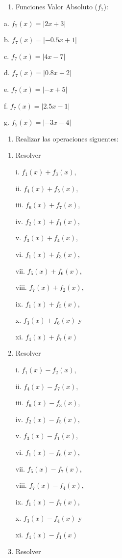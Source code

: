 \documentclass[]{book}
\providecommand{\tightlist}{%
  \setlength{\itemsep}{0pt}\setlength{\parskip}{0pt}}
\begin{document}
\begin{enumerate}
\def\labelenumi{\arabic{enumi}.}
\setcounter{enumi}{6}
\tightlist
\item
  Funciones Valor Absoluto (\(f_7\)):
\end{enumerate}

\begin{multicols}{2}
    a. $f_7(x) = |2x + 3|$
    
    b. $f_7(x) = |-0.5x + 1|$
    
    c. $f_7(x) = |4x - 7|$
    
    d. $f_7(x) = |0.8x + 2|$
    
    e. $f_7(x) = |-x + 5|$
    
    f. $f_7(x) = |2.5x - 1|$
    
    g. $f_7(x) = |-3x - 4|$
\end{multicols}

\begin{enumerate}
\def\labelenumi{\arabic{enumi}.}
\setcounter{enumi}{7}
\tightlist
\item
  Realizar las operaciones siguentes:
\end{enumerate}

\begin{enumerate}
\def\labelenumi{\alph{enumi}.}
\tightlist
\item
  Resolver

  \begin{multicols}{2}      
    i. $f_1(x)+f_3(x)$, 

    ii. $f_4(x)+f_5(x)$, 

    iii. $f_6(x)+f_7(x)$, 

    iv. $f_2(x)+f_1(x)$, 

    v. $f_3(x)+f_4(x)$, 

    vi. $f_1(x)+f_3(x)$, 

    vii. $f_5(x)+f_6(x)$, 

    viii. $f_7(x)+f_2(x)$, 

    ix. $f_1(x)+f_5(x)$,

    x. $f_3(x)+f_6(x)$ y

    xi. $f_4(x)+f_7(x)$
  \end{multicols}
\item
  Resolver

  \begin{multicols}{2}      

    i. $f_1(x)-f_2(x)$,

    ii. $f_4(x)-f_7(x)$, 

    iii. $f_6(x)-f_3(x)$, 

    iv. $f_2(x)-f_5(x)$, 

    v. $f_3(x)-f_1(x)$, 

    vi. $f_1(x)-f_6(x)$, 

    vii. $f_5(x)-f_7(x)$,

    viii. $f_7(x)-f_4(x)$, 

    ix. $f_1(x)-f_7(x)$,

    x. $f_3(x)-f_4(x)$ y

    xi. $f_4(x)-f_1(x)$
  \end{multicols}
\item
  Resolver
\end{enumerate}
\end{document}
